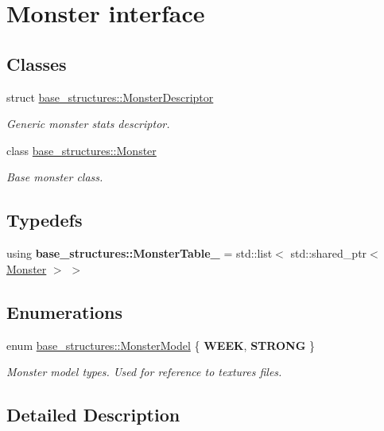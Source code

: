 \hypertarget{group__monster__interface}{}\section{Monster interface}
\label{group__monster__interface}
\subsection*{Classes}
\begin{DoxyCompactItemize}
\item 
struct \hyperlink{structbase__structures_1_1MonsterDescriptor}{base\+\_\+structures\+::\+Monster\+Descriptor}
\begin{DoxyCompactList}\small\item\em Generic monster stats descriptor. \end{DoxyCompactList}\item 
class \hyperlink{classbase__structures_1_1Monster}{base\+\_\+structures\+::\+Monster}
\begin{DoxyCompactList}\small\item\em Base monster class. \end{DoxyCompactList}\end{DoxyCompactItemize}
\subsection*{Typedefs}
\begin{DoxyCompactItemize}
\item 
\mbox{\label{group__monster__interface_ga7099717428292eb56e0fef05537da600}} 
using {\bfseries base\+\_\+structures\+::\+Monster\+Table\+\_\+} = std\+::list$<$ std\+::shared\+\_\+ptr$<$ \hyperlink{classbase__structures_1_1Monster}{Monster} $>$ $>$
\end{DoxyCompactItemize}
\subsection*{Enumerations}
\begin{DoxyCompactItemize}
\item 
\mbox{\label{group__monster__interface_ga92d84ad7c1ff9ec724366d3b4d0de044}} 
enum \hyperlink{group__monster__interface_ga92d84ad7c1ff9ec724366d3b4d0de044}{base\+\_\+structures\+::\+Monster\+Model} \{ {\bfseries W\+E\+EK}, 
{\bfseries S\+T\+R\+O\+NG}
 \}\begin{DoxyCompactList}\small\item\em Monster model types. Used for reference to textures files. \end{DoxyCompactList}
\end{DoxyCompactItemize}


\subsection{Detailed Description}
